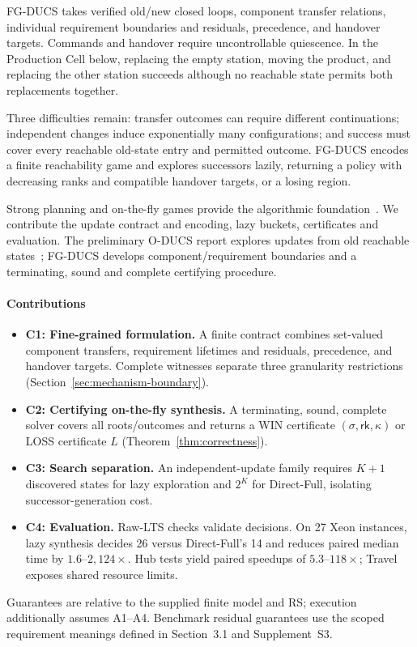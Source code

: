 \documentclass[acmsmall,screen,review,anonymous]{acmart}
\newcommand{\rank}{\mathsf{rk}}
\begin{document}
FG-DUCS takes verified old/new closed loops, component transfer relations, individual requirement boundaries and residuals, precedence, and handover targets. Commands and handover require uncontrollable quiescence. In the Production Cell below, replacing the empty station, moving the product, and replacing the other station succeeds although no reachable state permits both replacements together.

Three difficulties remain: transfer outcomes can require different continuations; independent changes induce exponentially many configurations; and success must cover every reachable old-state entry and permitted outcome. FG-DUCS encodes a finite reachability game and explores successors lazily, returning a policy with decreasing ranks and compatible handover targets, or a losing region.

Strong planning and on-the-fly games provide the algorithmic foundation~\cite{Cimatti1998StrongPlanning,TripakisAltisen1999,CiolekEtAl2023OTFDCS}. We contribute the update contract and encoding, lazy buckets, certificates and evaluation. The preliminary O-DUCS report explores updates from old reachable states~\cite{HiranoEtAl2024ODUCS}; FG-DUCS develops component/requirement boundaries and a terminating, sound and complete certifying procedure.

\paragraph{Contributions}
\begin{itemize}
\item \textbf{C1: Fine-grained formulation.} A finite contract combines set-valued component transfers, requirement lifetimes and residuals, precedence, and handover targets. Complete witnesses separate three granularity restrictions (Section~\ref{sec:mechanism-boundary}).
\item \textbf{C2: Certifying on-the-fly synthesis.} A terminating, sound, complete solver covers all roots/outcomes and returns a WIN certificate $(\sigma,\rank,\kappa)$ or LOSS certificate $L$ (Theorem~\ref{thm:correctness}).
\item \textbf{C3: Search separation.} An independent-update family requires $K+1$ discovered states for lazy exploration and $2^K$ for Direct-Full, isolating successor-generation cost.
\item \textbf{C4: Evaluation.} Raw-LTS checks validate decisions. On 27 Xeon instances, lazy synthesis decides 26 versus Direct-Full's 14 and reduces paired median time by $1.6$--$2{,}124\times$. Hub tests yield paired speedups of $5.3$--$118\times$; Travel exposes shared resource limits.
\end{itemize}
Guarantees are relative to the supplied finite model and RS; execution additionally assumes A1--A4. Benchmark residual guarantees use the scoped requirement meanings defined in Section~3.1 and Supplement~S3.
\end{document}
